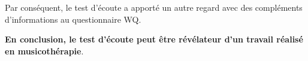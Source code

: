                 Par conséquent,  le test d'écoute a
                apporté un autre regard avec des compléments d'informations au questionnaire
                WQ.

                \textbf{ En conclusion, le test
                d'écoute peut être \textbf{révélateur d'un
                travail réalisé en musicothérapie}}.


























































































